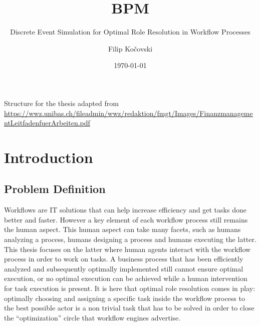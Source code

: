 \documentclass{seal_thesis}
\date{\today}
\title{BPM}
\subtitle{Discrete Event Simulation for Optimal Role Resolution in Workflow Processes}
\author{Filip Ko\v{c}ovski}
\begin{document}
\maketitle

\frontmatter

\begin{acknowledgements}

\end{acknowledgements}

\begin{abstract}

\end{abstract}

\begin{zusammenfassung}

\end{zusammenfassung}

\tableofcontents
\listoffigures
\listoftables
\lstlistoflistings

\pagebreak

\mainmatter

Structure for the thesis adapted from \url{https://wwz.unibas.ch/fileadmin/wwz/redaktion/fmgt/Images/FinanzmanagementLeitfadenfuerArbeiten.pdf}

\chapter{Introduction}
\label{ch:intro}

\section{Problem Definition}

Workflows are IT solutions that can help increase efficiency and get tasks done better and faster. However a key element of each workflow process still remains the human aspect. This human aspect can take many facets, such as humans analyzing a process, humans designing a process and humans executing the latter. This thesis focuses on the latter \ie where human agents interact with the workflow process in order to work on tasks. A business process that has been efficiently analyzed and subsequently optimally implemented still cannot ensure optimal execution, or no optimal execution can be achieved while a human intervention for task execution is present. It is here that optimal role resolution comes in play: optimally choosing and assigning a specific task inside the workflow process to the best possible actor is a non trivial task that has to be solved in order to close the ``optimization'' circle that workflow engines advertise.
\end{document}

